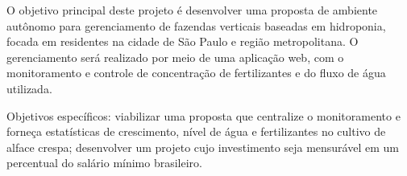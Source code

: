 O objetivo principal deste projeto é desenvolver uma proposta de ambiente autônomo para gerenciamento de fazendas verticais baseadas em hidroponia, focada em residentes na cidade de São Paulo e região metropolitana. O gerenciamento será realizado por meio de uma aplicação web, com o monitoramento e controle de concentração de fertilizantes e do fluxo de água utilizada.

Objetivos específicos: viabilizar uma proposta que centralize o monitoramento e forneça estatísticas de crescimento, nível de água e fertilizantes no cultivo de alface crespa; desenvolver um projeto cujo investimento seja mensurável em um percentual do salário mínimo brasileiro.